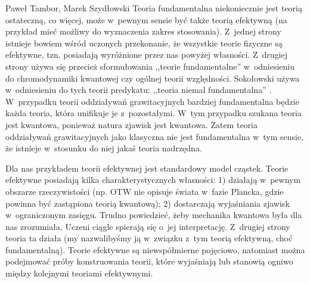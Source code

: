 \begin{artplenv2auth}{Paweł Tambor, Marek Szydłowski}
Teoria fundamentalna niekoniecznie jest teorią ostateczną, co więcej, może w~pewnym sensie być także teorią efektywną (na przykład mieć możliwy do wyznaczenia zakres stosowania). Z~jednej strony istnieje bowiem wśród uczonych przekonanie, że wszystkie teorie fizyczne są efektywne, tzn. posiadają wyróżnione przez nas powyżej własności. Z~drugiej strony używa się przecież sformułowania ,,teorie fundamentalne'' w~odniesieniu do chromodynamiki kwantowej czy ogólnej teorii względności. Sokołowski używa w~odniesieniu do tych teorii predykatu: ,,teoria niemal fundamentalna''
\parencite[][s.~122]{sokolowski_teorie_2006}. %
 W~przypadku teorii oddziaływań grawitacyjnych bardziej fundamentalna będzie każda teoria, która unifikuje je z~pozostałymi. W~tym przypadku szukana teoria jest kwantowa, ponieważ natura zjawisk jest kwantowa. Zatem teoria oddziaływań grawitacyjnych jako klasyczna nie jest fundamentalna w~tym sensie, że istnieje w~stosunku do niej jakaś teoria nadrzędna.

Dla nas przykładem teorii efektywnej jest standardowy model cząstek. Teorie efektywne posiadają kilka charakterystycznych własności: 1) działają w~pewnym obszarze rzeczywistości (np. OTW nie opisuje świata w~fazie Plancka, gdzie powinna być zastąpiona teorią kwantową); 2) dostarczają wyjaśniania zjawisk w~ograniczonym zasięgu. Trudno powiedzieć, żeby mechanika kwantowa była dla nas zrozumiała. Uczeni ciągle spierają się o~jej interpretację. Z~drugiej strony teoria ta działa (my nazwalibyśmy ją w~związku z~tym teorią efektywną, choć fundamentalną). Teorie efektywne są niewspółmierne pojęciowo, natomiast można podejmować próby konstruowania teorii, które wyjaśniają lub stanowią ogniwo między kolejnymi teoriami efektywnymi.


\end{artplenv2auth}
